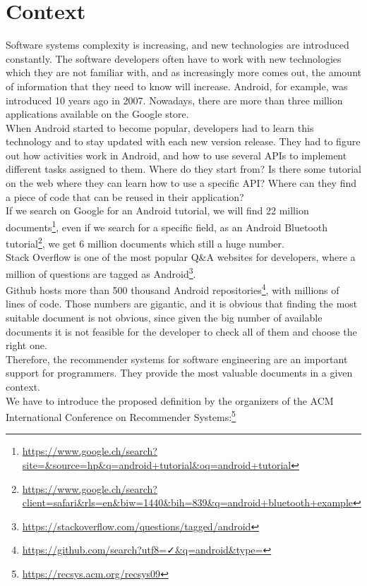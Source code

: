 \documentclass[12pt,mscthesis]{usiinfthesis}
\begin{document}
	\section{Context}
	Software systems complexity is increasing, and new technologies are introduced constantly. The software developers often have to work with new technologies which they are not familiar with, and as increasingly more comes out, the amount of information that they need to know will increase. Android, for example, was introduced 10 years ago in 2007. Nowadays, there are more than three million applications available on the Google store. \\
	When Android started to become popular, developers had to learn this technology and to stay updated with each new version release. 
	They had to figure out how activities work in Android, and how to use several APIs to implement different tasks assigned to them. Where do they start from? Is there some tutorial on the web where they can learn how to use a specific API? Where can they find a piece of code that can be reused in their application? \\
	If we search on Google for an Android tutorial, we will find 22 million documents\footnote{\url{https://www.google.ch/search?site=&source=hp&q=android+tutorial&oq=android+tutorial}}, even if we search for a specific field, as an Android Bluetooth tutorial\footnote{\url{https://www.google.ch/search?client=safari&rls=en&biw=1440&bih=839&q=android+bluetooth+example}}, we get 6 million documents which still a huge number.\\
	Stack Overflow is one of the most popular Q\&A websites for developers, where a million of questions are tagged as Android\footnote{\url{https://stackoverflow.com/questions/tagged/android}}. \\
	Github hosts more than 500 thousand Android repositories\footnote{\url{https://github.com/search?utf8=✓&q=android&type=}}, with millions of lines of code. Those numbers are gigantic, and it is obvious that finding the most suitable document is not obvious, since given the big number of available documents it is not feasible for the developer to check all of them and choose the right one.\\
	Therefore, the recommender systems for software engineering are an important support for programmers. They provide the most valuable documents in a given context.\\

	We have to introduce the proposed definition by the organizers of the ACM International Conference on Recommender Systems:\footnote{\url{https://recsys.acm.org/recsys09}} \\
\end{document}
